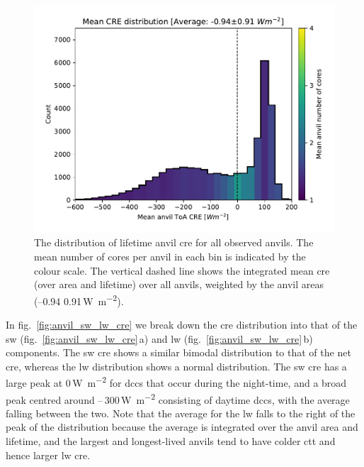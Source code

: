 \documentclass[acp, manuscript]{copernicus}
\begin{document}
\begin{figure}[tp]
    \includegraphics[width=12cm]{figures/fig11.pdf}
    \caption[
    The distribution of lifetime anvil \acrshort{cre} for all observed anvils
    ]{
    The distribution of lifetime anvil \acrshort{cre} for all observed anvils. The mean number of cores per anvil in each bin is indicated by the colour scale. The vertical dashed line shows the integrated mean \acrshort{cre} (over area and lifetime) over all anvils, weighted by the anvil areas (--0.94\,\textpm\,0.91\,\unit{W m^{-2}}).
    }
    \label{fig:anvil_cre_dist}
\end{figure}


In fig.~\ref{fig:anvil_sw_lw_cre} we break down the \acrshort{cre} distribution into that of the \acrshort{sw} (fig.~\ref{fig:anvil_sw_lw_cre}\,a) and \acrshort{lw} (fig.~\ref{fig:anvil_sw_lw_cre}\,b) components. 
The \acrshort{sw} \acrshort{cre} shows a similar bimodal distribution to that of the net \acrshort{cre}, whereas the \acrshort{lw} distribution shows a normal distribution. 
The \acrshort{sw} \acrshort{cre} has a large peak at 0\,\unit{W m^{-2}} for \acrshort{dcc}s that occur during the night-time, and a broad peak centred around --\,300\,\unit{W m^{-2}} consisting of daytime \acrshort{dcc}s, with the average falling between the two. 
Note that the average for the \acrshort{lw} falls to the right of the peak of the distribution because the average is integrated over the anvil area and lifetime, and the largest and longest-lived anvils tend to have colder \acrshort{ctt} and hence larger \acrshort{lw} \acrshort{cre}.
\end{document}
